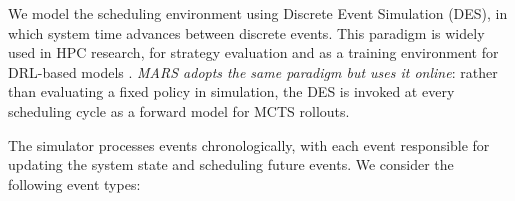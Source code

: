 \documentclass[conference]{IEEEtran}
\begin{document}


We model the scheduling environment using Discrete Event Simulation (DES), in which system time advances between discrete events. This paradigm is widely used in HPC research, for strategy evaluation \cite{rodrigo2018scsf, dutot2017batsim, klusavcek2020alea, galleguillos2020accasim} and as a training environment for DRL-based models \cite{zhang_rlscheduler_2020, fan_deep_2021, yang_deep_2022, zhang_schedinspector_2022}. \emph{MARS adopts the same paradigm but uses it online}: rather than evaluating a fixed policy in simulation, the DES is invoked at every scheduling cycle as a forward model for MCTS rollouts.

The simulator processes events chronologically, with each event responsible for updating the system state and scheduling future events. We consider the following event types:
\end{document}
